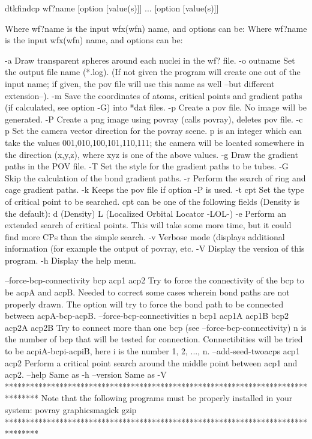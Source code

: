 	dtkfindcp wf?name [option [value(s)]] ... [option [value(s)]]

Where wf?name is the input wfx(wfn) name, and options can be:
Where wf?name is the input wfx(wfn) name, and options can be:

  -a        	Draw transparent spheres around each nuclei in the wf? file.
  -o outname	Set the output file name (*.log).
            	  (If not given the program will create one out of
            	  the input name; if given, the pov file will
            	  use this name as well --but different extension--).
  -m        	Save the coordinates of atoms, critical points and gradient
            	  paths (if calculated, see option -G) into *dat files.
  -p     	Create a pov file. No image will be generated.
  -P     	Create a png image using povray (calls povray),
         	  deletes pov file.
  -c p   	Set the camera vector direction for the povray scene.
         	  p is an integer which can take the values
         	  001,010,100,101,110,111; the camera will be located
         	  somewhere in the direction (x,y,z), where xyz is one of 
         	  the above values.
  -g     	Draw the gradient paths in the POV file.
  -T     	Set the style for the gradient paths to be tubes.
  -G     	Skip the calculation of the bond gradient paths.
  -r     	Perform the search of ring and cage gradient paths.
  -k     	Keeps the pov file if option -P is used.
  -t cpt 	Set the type of critical point to be searched. cpt can be 
         	  one of the following fields (Density is the default):
         		d (Density)
         		L (Localized Orbital Locator -LOL-)
  -e     	Perform an extended search of critical points. This
         	  will take some more time, but it could find more CPs
         	  than the simple search.
  -v     	Verbose mode (displays additional information (for example the 
         	  output of povray, etc.
  -V        	Display the version of this program.
  -h		Display the help menu.

  --force-bcp-connectivity bcp acp1 acp2 	Try to force the connectivity
            		  of the bcp to be acpA and acpB. Needed to correct some
            		  cases wherein bond paths are not properly drawn.
            		  The option will try to force the bond path to be
            		  connected between acpA-bcp-acpB.
  --force-bcp-connectivities n bcp1 acp1A acp1B bcp2 acp2A acp2B
            		  Try to connect more than one bcp (see --force-bcp-connectivity)
            		  n is the number of bcp that will be tested for connection.
            		  Connectibities will be tried to be acpiA-bcpi-acpiB,
            		  here i is the number 1, 2, ..., n.
  --add-seed-twoacps acp1 acp2 	 Perform a critical point search around
            		  the middle point between acp1 and acp2.
  --help    		Same as -h
  --version 		Same as -V
********************************************************************************
  Note that the following programs must be properly installed in your system:
                                     povray
                                 graphicsmagick
                                      gzip
********************************************************************************

